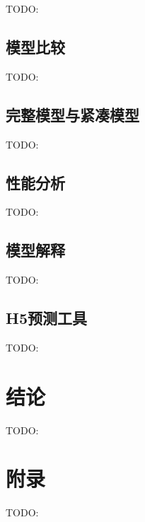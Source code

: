 \documentclass[12pt,titlepage]{article}
\begin{document}
TODO:

\subsection{模型比较}

TODO:

\subsection{完整模型与紧凑模型}

TODO:

\subsection{性能分析}

TODO:

\subsection{模型解释}

TODO:

\subsection{H5预测工具}

TODO:


\section{结论}

TODO:


\appendix
\section{附录}

TODO:
\end{document}
